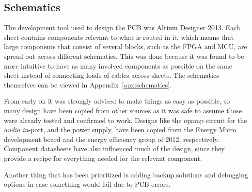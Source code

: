 
\subsection{Schematics}

The development tool used to design the PCB was Altium Designer
2013. Each sheet contains components relevant to what is routed
in it, which means that large components that consist of
several blocks, such as the FPGA and MCU, are spread out across
different schematics. This was done because it was found to be
more intuitive to have as many involved components as possible
on the same sheet instead of connecting loads of cables across
sheets. The schematics themselves can be viewed in
Appendix~\ref{apx:schematics}.

From early on it was strongly advised to make things as easy as
possible, so many design have been copied from other sources as
it was safe to assume those were already tested and confirmed to
work. Designs like the opamp circuit for the \emph{audio
in}-port, and the power supply, have been copied from the Energy
Micro development board and the energy efficiency group of 2012,
respectively. Component datasheets have also influenced much of
the design, since they provide a recipe for everything needed
for the relevant component.

Another thing that has been prioritized is adding backup
solutions and debugging options in case something would fail
due to PCB errors. 


